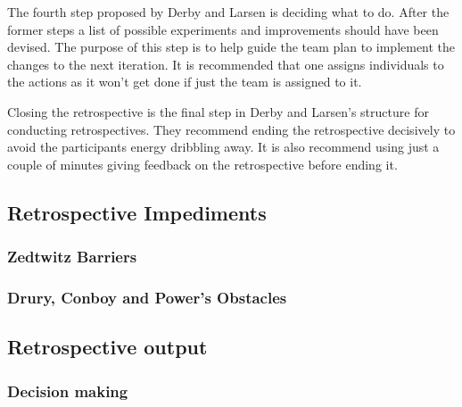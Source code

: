 The fourth step proposed by Derby and Larsen is deciding what to do. After the former steps a list of possible experiments and improvements should have been devised. The purpose of this step is to help guide the team plan to implement the changes to the next iteration. It is recommended that one assigns individuals to the actions as it won't get done if just the team is assigned to it. 

Closing the retrospective is the final step in Derby and Larsen's structure for conducting retrospectives. They recommend ending the retrospective decisively to avoid the participants energy dribbling away. It is also recommend using just a couple of minutes giving feedback on the retrospective before ending it. 

\subsubsection{}

\subsection{Retrospective Impediments}
\subsubsection{Zedtwitz Barriers}
\subsubsection{Drury, Conboy and Power's Obstacles}


\subsection{Retrospective output}


\subsubsection{Decision making}

